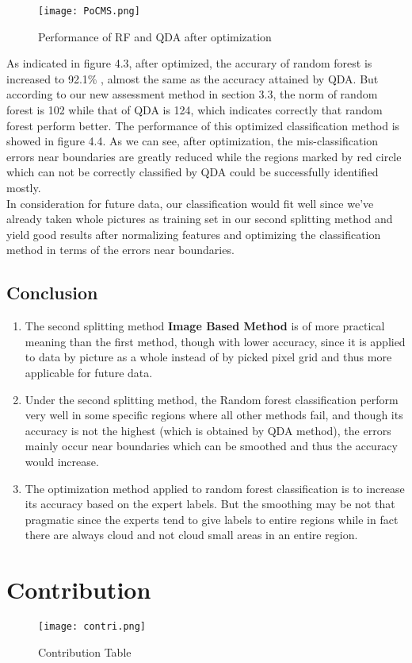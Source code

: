 \documentclass[11pt]{scrartcl} %
\begin{document}
\begin{figure}[htb]
	\centering
	\texttt{[image: PoCMS.png]} %
	\caption{Performance of RF and QDA after optimization}
\end{figure}



As indicated in  figure 4.3, after optimized, the accurary of random forest is increased to 92.1\% , almost the same as the accuracy attained by QDA. But according to our new assessment method in section 3.3, the norm of random forest is 102 while that of QDA is 124, which indicates correctly that random forest perform better. The performance of this optimized classification method is showed in figure 4.4. As we can see, after optimization, the mis-classification errors near boundaries are greatly reduced while the regions marked by red circle which can not be correctly classified by QDA could be successfully identified mostly.  \\

In consideration for future data, our classification would fit well since we've already taken whole pictures as training set in our second splitting method and yield good results after normalizing features and optimizing the classification method in terms of the errors near boundaries.


\subsection{Conclusion}

\begin{enumerate}
   \item The second splitting method \textbf{Image Based Method} is of more practical meaning than the first method, though  with lower accuracy, since it is applied to data by picture as a whole instead of by picked pixel grid and thus more applicable for future data.
   \item Under the second splitting method, the Random forest classification perform very well in some specific regions where all other methods fail, and though its accuracy is not the highest (which is obtained by QDA method), the errors mainly occur near boundaries which can be smoothed and thus the accuracy would increase.
   \item The optimization method applied to random forest classification is to increase its accuracy based on the expert labels. But the smoothing may be not that pragmatic since the experts tend to give labels to entire regions while in fact there are always cloud and not cloud small areas in an entire region.
\end{enumerate}

\section{Contribution}

\begin{figure}[htb]
	\centering
	\texttt{[image: contri.png]} %
	\caption{Contribution Table}
\end{figure}
\end{document}
